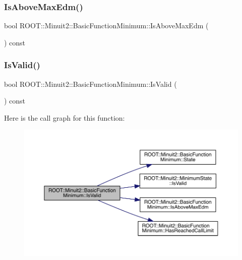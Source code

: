 \subsubsection{\texorpdfstring{IsAboveMaxEdm()}{IsAboveMaxEdm()}\hspace{0.1cm}{\footnotesize\ttfamily [2/2]}}
{\footnotesize\ttfamily bool R\+O\+O\+T\+::\+Minuit2\+::\+Basic\+Function\+Minimum\+::\+Is\+Above\+Max\+Edm (\begin{DoxyParamCaption}{ }\end{DoxyParamCaption}) const\hspace{0.3cm}{\ttfamily [inline]}}

\mbox{\label{classROOT_1_1Minuit2_1_1BasicFunctionMinimum_a644f34dabb94b0b5bdc8f7b8bfa7ae4b}} 
\subsubsection{\texorpdfstring{IsValid()}{IsValid()}\hspace{0.1cm}{\footnotesize\ttfamily [1/2]}}
{\footnotesize\ttfamily bool R\+O\+O\+T\+::\+Minuit2\+::\+Basic\+Function\+Minimum\+::\+Is\+Valid (\begin{DoxyParamCaption}{ }\end{DoxyParamCaption}) const\hspace{0.3cm}{\ttfamily [inline]}}

Here is the call graph for this function\+:
\nopagebreak
\begin{figure}[H]
\begin{center}
\leavevmode
\includegraphics[width=350pt]{de/d25/classROOT_1_1Minuit2_1_1BasicFunctionMinimum_a644f34dabb94b0b5bdc8f7b8bfa7ae4b_cgraph}
\end{center}
\end{figure}
\mbox{\label{classROOT_1_1Minuit2_1_1BasicFunctionMinimum_a644f34dabb94b0b5bdc8f7b8bfa7ae4b}} 
